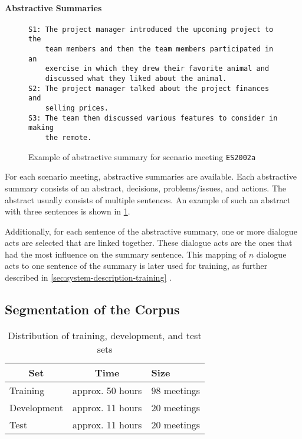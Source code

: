 \paragraph{Abstractive Summaries}

\begin{figure}[h]
\begin{lstlisting}[numbers=none]
S1: The project manager introduced the upcoming project to the 
    team members and then the team members participated in an
    exercise in which they drew their favorite animal and
    discussed what they liked about the animal.
S2: The project manager talked about the project finances and
    selling prices.
S3: The team then discussed various features to consider in making
    the remote.
\end{lstlisting}
\caption{Example of abstractive summary for scenario meeting \texttt{ES2002a}}
\label{fig:abstractive-summary-example}
\end{figure}

For each scenario meeting, abstractive summaries are available.
Each abstractive summary consists of an abstract, decisions, problems/issues, and actions.
The abstract usually consists of multiple sentences.
An example of such an abstract with three sentences is shown in \cref{fig:abstractive-summary-example}.

Additionally, for each sentence of the abstractive summary, one or more dialogue acts are selected that are linked together.
These dialogue acts are the ones that had the most influence on the summary sentence.
This mapping of $n$ dialogue acts to one sentence of the summary is later used for training, as further described in \cref{sec:system-description-training} \cite{amiWebsite}.

\subsection{Segmentation of the Corpus}\label{ssec:ami-segmentation-of-the-corpus}

\begin{table}[h]
\centering
\begin{tabular}{@{}lll@{}}
\toprule
\multicolumn{1}{c}{\textbf{Set}} & \multicolumn{1}{c}{\textbf{Time}} & \textbf{Size} \\ \midrule
Training                         & approx. 50 hours                  & 98 meetings   \\
Development                      & approx. 11 hours                  & 20 meetings   \\
Test                             & approx. 11 hours                  & 20 meetings   \\ \bottomrule
\end{tabular}
\caption[Distribution of training, development, and test sets]{Distribution of training, development, and test sets \cite{amiWebsite}}
\label{tab:meeting-time-distribution}
\end{table}

